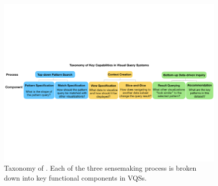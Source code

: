 \begin{figure}[ht!]
  \centering
  \includegraphics[width=0.9\linewidth]{figures/taxonomy.pdf}
  \caption{Taxonomy of . Each of the three sensemaking process is broken down into key functional components in VQSs. } %
  \label{fig:taxonomy}
\end{figure}
